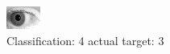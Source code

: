 \begin{figure}[h!]
\begin{center}
\includegraphics[width=0.60\columnwidth]{figures/ID239_class_4_target_3.png}
\end{center}
\caption{ Classification: 4 actual target: 3}
\label{fig:ID239_class_4_target_3}
\end{figure}
